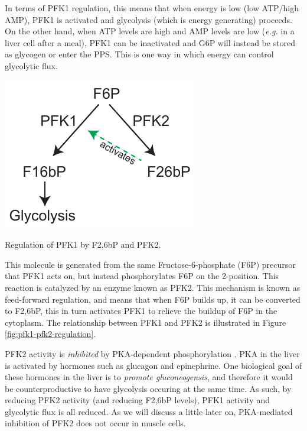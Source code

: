 \documentclass{tufte-handout}
\begin{document}
  In terms of PFK1 regulation, this means that when energy is low (low ATP/high AMP), PFK1 is activated and glycolysis (which is energy generating) proceeds.  On the other hand, when ATP levels are high and AMP levels are low (\textit{e.g.} in a liver cell after a meal), PFK1 can be inactivated and G6P will instead be stored as glycogen or enter the PPS.  This is one way in which energy can control glycolytic flux.

\begin{marginfigure}
\includegraphics{figures/pfk1-pfk2-regulation.pdf}
\caption{Regulation of PFK1 by F2,6bP and PFK2.}
\label{fig:pfk1-pfk2-regulation}
\end{marginfigure}

  This molecule is generated from the same Fructose-6-phosphate (F6P) precursor that PFK1 acts on, but instead phosphorylates F6P on the 2-position.  This reaction is catalyzed by an enzyme known as PFK2.  This mechanism is known as feed-forward regulation, and means that when F6P builds up, it can be converted to F2,6bP, this in turn activates PFK1 to relieve the buildup of F6P in the cytoplasm.  The relationship between PFK1 and PFK2 is illustrated in Figure \ref{fig:pfk1-pfk2-regulation}.

  PFK2 activity is \emph{inhibited} by PKA-dependent phosphorylation \citep{VanSchaftingen1981}.  PKA in the liver is activated by hormones such as glucagon and epinephrine.  One biological goal of these hormones in the liver is to \emph{promote gluconeogensis}, and therefore it would be counterproductive to have glycolysis occuring at the same time.  As such, by reducing PFK2 activity (and reducing F2,6bP levels), PFK1 activity and glycolytic flux is all reduced.  As we will discuss a little later on, PKA-mediated inhibition of PFK2 does not occur in muscle cells.
\end{document}
